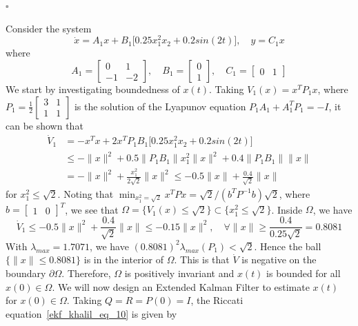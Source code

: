 \documentclass[12pt,a4paper,oneside]{book}
\begin{document}
\begin{onehalfspace}
\hfill $\square$
\begin{example} Consider the system
	\begin{equation*}
		\dot{x}=A_1x+B_1\big[0.25x_1^2x_2+0.2sin(2t)\big], \quad y=C_1x
	\end{equation*}
where
\begin{equation*}
	A_1=\begin{bmatrix} 0&1 \\[6pt] -1&-2
	\end{bmatrix},\quad
	B_1=\begin{bmatrix}	0 \\[6pt] 1
	\end{bmatrix},\quad
	C_1=\begin{bmatrix}	0 & 1
	\end{bmatrix}
\end{equation*}
We start by investigating boundedness of $x(t)$. Taking $V_1(x) = x^TP_1x$, where $P_1=\frac{1}{2}\begin{bmatrix}
	3&1\\1&1 \end{bmatrix}$ is the solution of the Lyapunov equation $P_1A_1+A_1^TP_1=-I$, it can be shown that
\begin{equation*}
	\begin{aligned}
		\dot{V}_1&=-x^Tx + 2x^TP_1B_1\big[0.25x_1^2x_2+0.2sin(2t)\big] \\[6pt]
		&\le -\|x\|^2+0.5\|P_1B_1\|x_1^2\|x\|^2+0.4\|P_1B_1\|\|x\| \\[6pt]
		&= -\|x\|^2+\frac{x_1^2}{2\sqrt{2}}\|x\|^2\le-0.5\|x\|+\frac{0.4}{\sqrt{2}}\|x\|
	\end{aligned}
\end{equation*}
for $x_1^2\le\sqrt{2}$. Noting that $\min_{x_1^2=\sqrt{2}}x^TPx=\sqrt{2}/(b^TP^{-1}b)\sqrt{2}$, where $b=\begin{bmatrix} 1&0 \end{bmatrix}^T$, we see that $\Omega=\big\{V_1(x)\le\sqrt{2}\big\}\subset\big\{x_1^2\le\sqrt{2}\big\}$. Inside $\Omega$, we have
\begin{equation*}
	\dot{V}_1\le-0.5\|x\|^2+\frac{0.4}{\sqrt{2}}\|x\|\le-0.15\|x\|^2,\quad\forall\|x\|\ge\frac{0.4}{0.25\sqrt{2}}=0.8081
\end{equation*}
With $\lambda_{max}=1.7071$, we have $(0.8081)^2\lambda_{max}(P_1)<\sqrt{2}$. Hence the ball $\big\{\|x\|\le0.8081\big\}$ is in the interior of $\Omega$. This is that $\dot{V}$ is negative on the boundary $\partial\Omega$. Therefore, $\Omega$ is positively invariant and $x(t)$ is bounded for all $x(0)\in\Omega$. We will now design an Extended Kalman Filter to estimate $x(t)$ for $x(0)\in\Omega$. Taking $Q=R=P(0)=I$, the Riccati equation~\eqref{ekf_khalil_eq_10} is given by

\end{example}
\end{onehalfspace}
\end{document}
